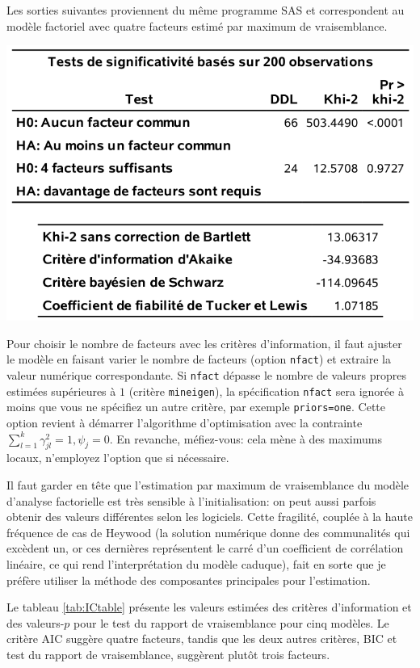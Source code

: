 \documentclass[
  11pt,
  letterpaper,
]{book}
\theoremstyle{definition}
\theoremstyle{definition}
\theoremstyle{definition}
\theoremstyle{remark}
\begin{document}
Les sorties suivantes proviennent du même programme SAS et correspondent au modèle factoriel avec quatre facteurs estimé par maximum de vraisemblance.

\begin{center}\includegraphics[width=0.7\linewidth]{figures/01-facto-e4} \end{center}

Pour choisir le nombre de facteurs avec les critères d'information, il faut ajuster le modèle en faisant varier le nombre de facteurs (option \texttt{nfact}) et extraire la valeur numérique correspondante. Si \texttt{nfact} dépasse le nombre de valeurs propres estimées supérieures à \(1\) (critère \texttt{mineigen}), la spécification \texttt{nfact} sera ignorée à moins que vous ne spécifiez un autre critère, par exemple \texttt{priors=one}. Cette option revient à démarrer l'algorithme d'optimisation avec la contrainte \(\sum_{l=1}^k \gamma_{jl}^2=1, \psi_j=0\). En revanche, méfiez-vous: cela mène à des maximums locaux, n'employez l'option que si nécessaire.

Il faut garder en tête que l'estimation par maximum de vraisemblance du modèle d'analyse factorielle est très sensible à l'initialisation: on peut aussi parfois obtenir des valeurs différentes selon les logiciels. Cette fragilité, couplée à la haute fréquence de cas de Heywood (la solution numérique donne des communalités qui excèdent un, or ces dernières représentent le carré d'un coefficient de corrélation linéaire, ce qui rend l'interprétation du modèle caduque), fait en sorte que je préfère utiliser la méthode des composantes principales pour l'estimation.

Le tableau \ref{tab:ICtable} présente les valeurs estimées des critères d'information et des valeurs-\(p\) pour le test du rapport de vraisemblance pour cinq modèles. Le critère AIC suggère quatre facteurs, tandis que les deux autres critères, BIC et test du rapport de vraisemblance, suggèrent plutôt trois facteurs.
\end{document}
